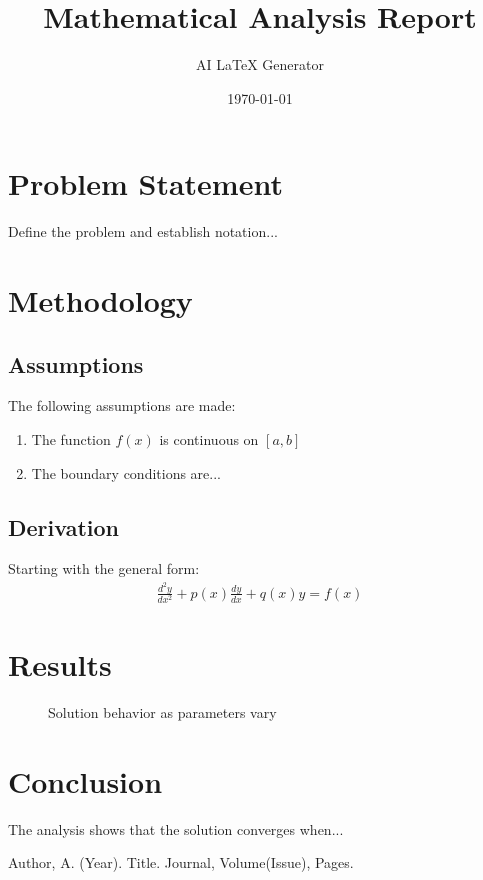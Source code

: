 \documentclass{article}
\title{Mathematical Analysis Report}
\author{AI LaTeX Generator}
\date{\today}
\begin{document}
\maketitle

\section{Problem Statement}
Define the problem and establish notation...

\section{Methodology}
\subsection{Assumptions}
The following assumptions are made:
\begin{enumerate}
    \item The function $f(x)$ is continuous on $[a,b]$
    \item The boundary conditions are...
\end{enumerate}

\subsection{Derivation}
Starting with the general form:
\begin{align}
\frac{d^2y}{dx^2} + p(x)\frac{dy}{dx} + q(x)y = f(x)
\end{align}

\section{Results}
\begin{figure}[h]
    \centering
    \caption{Solution behavior as parameters vary}
\end{figure}

\section{Conclusion}
The analysis shows that the solution converges when...

\begin{thebibliography}{9}
 Author, A. (Year). Title. Journal, Volume(Issue), Pages.
\end{thebibliography}
\end{document}
